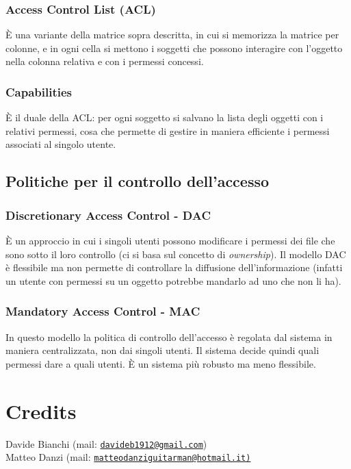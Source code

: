 \documentclass[a4paper, 11pt]{article}
\newcommand{\mail}[1]{\href{mailto:#1}{\texttt{#1}}}
\begin{document}
\begin{multicols}{2}
	\subsubsection{Access Control List (ACL)}
	È una variante della matrice sopra descritta, in cui si memorizza la matrice per colonne, e in ogni cella si mettono i soggetti che possono interagire con l'oggetto nella colonna relativa e con i permessi concessi.
	
	\subsubsection{Capabilities}
	È il duale della ACL: per ogni soggetto si salvano la lista degli oggetti con i relativi permessi, cosa che permette di gestire in maniera efficiente i permessi associati al singolo utente.
	
	\subsection{Politiche per il controllo dell'accesso}
	\subsubsection{Discretionary Access Control - DAC}
		È un approccio in cui i singoli utenti possono modificare i permessi dei file che sono sotto il loro controllo (ci si basa sul concetto di \textit{ownership}). Il modello DAC è flessibile ma non permette di controllare la diffusione dell'informazione (infatti un utente con permessi su un oggetto potrebbe mandarlo ad uno che non li ha).
	
	\subsubsection{Mandatory Access Control - MAC}
	In questo modello la politica di controllo dell'accesso è regolata dal sistema in maniera centralizzata, non dai singoli utenti. Il sistema decide quindi quali permessi dare a quali utenti. È un sistema più robusto ma meno flessibile.
		
		
		
		
		
		
		
	
	
	
	
	
	
	
	
	
	
	
	
	
	\end{multicols}

	\section{Credits}
	Davide Bianchi (mail: \mail{davideb1912@gmail.com}) \\
	Matteo Danzi (mail: \mail{matteodanziguitarman@hotmail.it)}
	
\end{document}
